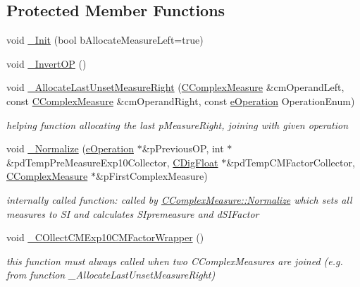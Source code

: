 \subsection*{Protected Member Functions}
\begin{DoxyCompactItemize}
\item 
void \hyperlink{classCComplexMeasure_aed6efc43efe99d8cf1072ac98ec8d21c}{\+\_\+\+Init} (bool b\+Allocate\+Measure\+Left=true)
\item 
void \hyperlink{classCComplexMeasure_a6f071c1bd1340fea78a2aa90d1b6496f}{\+\_\+\+Invert\+OP} ()
\item 
void \hyperlink{classCComplexMeasure_aee812c93b8b2fe3839e9a38df63cfd53}{\+\_\+\+Allocate\+Last\+Unset\+Measure\+Right} (\hyperlink{classCComplexMeasure}{C\+Complex\+Measure} \&cm\+Operand\+Left, const \hyperlink{classCComplexMeasure}{C\+Complex\+Measure} \&cm\+Operand\+Right, const \hyperlink{MeasureOperator_8h_a1431c79e3ad4b4c5bcc9f31f188538f2}{e\+Operation} Operation\+Enum)
\begin{DoxyCompactList}\small\item\em helping function allocating the last p\+Measure\+Right, joining with given operation \end{DoxyCompactList}\item 
void \hyperlink{classCComplexMeasure_abd62182294ebd217cdd9af40d0af7e38}{\+\_\+\+Normalize} (\hyperlink{MeasureOperator_8h_a1431c79e3ad4b4c5bcc9f31f188538f2}{e\+Operation} $\ast$\&p\+Previous\+OP, int $\ast$\&pd\+Temp\+Pre\+Measure\+Exp10\+Collector, \hyperlink{classCDigFloat}{C\+Dig\+Float} $\ast$\&pd\+Temp\+C\+M\+Factor\+Collector, \hyperlink{classCComplexMeasure}{C\+Complex\+Measure} $\ast$\&p\+First\+Complex\+Measure)
\begin{DoxyCompactList}\small\item\em internally called function\+: called by \hyperlink{classCComplexMeasure_a87cc1f3c3f0dafd7cbe00634124c8d46}{C\+Complex\+Measure\+::\+Normalize} which sets all measures to SI and calculates S\+Ipremeasure and d\+S\+I\+Factor \end{DoxyCompactList}\item 
void \hyperlink{classCComplexMeasure_ad96c02d0791585e8bc138212e44bb743}{\+\_\+\+C\+Ollect\+C\+M\+Exp10\+C\+M\+Factor\+Wrapper} ()
\begin{DoxyCompactList}\small\item\em this function must always called when two C\+Complex\+Measures are joined (e.\+g. from function \+\_\+\+Allocate\+Last\+Unset\+Measure\+Right) \end{DoxyCompactList}\item 

\end{DoxyCompactItemize}
